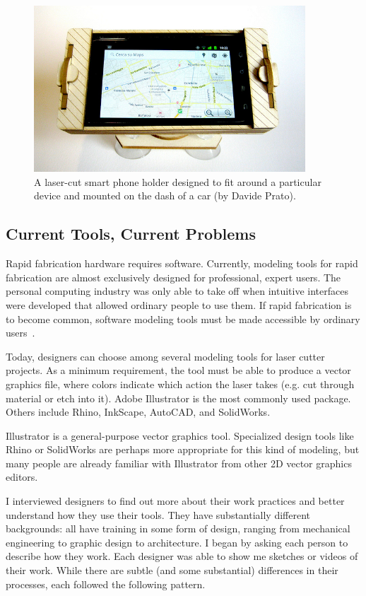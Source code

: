\documentclass[12pt]{article}
\begin{document}
\begin{figure}[h] %
   \centering
   \includegraphics[width=4in]{img/phone-holder.jpg} 
   \caption{A laser-cut smart phone holder designed to fit around a
     particular device and mounted on the dash of a car (by Davide
     Prato).}
   \label{fig:phone-holder}
\end{figure}

\subsection{Current Tools, Current Problems}

Rapid fabrication hardware requires software. Currently, modeling
tools for rapid fabrication are almost exclusively designed for
professional, expert users. The personal computing industry was only
able to take off when intuitive interfaces were developed that allowed
ordinary people to use them. If rapid fabrication is to become common,
software modeling tools must be made accessible by ordinary
users~\cite{lipson-homefactory}.

Today, designers can choose among several modeling tools for laser
cutter projects. As a minimum requirement, the tool must be able to
produce a vector graphics file, where colors indicate which action the
laser takes (e.g. cut through material or etch into it). Adobe
Illustrator is the most commonly used package. Others include Rhino,
InkScape, AutoCAD, and SolidWorks.

Illustrator is a general-purpose vector graphics tool. Specialized
design tools like Rhino or SolidWorks are perhaps more appropriate for
this kind of modeling, but many people are already familiar with
Illustrator from other 2D vector graphics editors. 

I interviewed designers to find out more about their work practices
and better understand how they use their tools. They have
substantially different backgrounds: all have training in some form of
design, ranging from mechanical engineering to graphic design to
architecture. I began by asking each person to describe how they
work. Each designer was able to show me sketches or videos of their
work. While there are subtle (and some substantial) differences in
their processes, each followed the following pattern.
\end{document}
